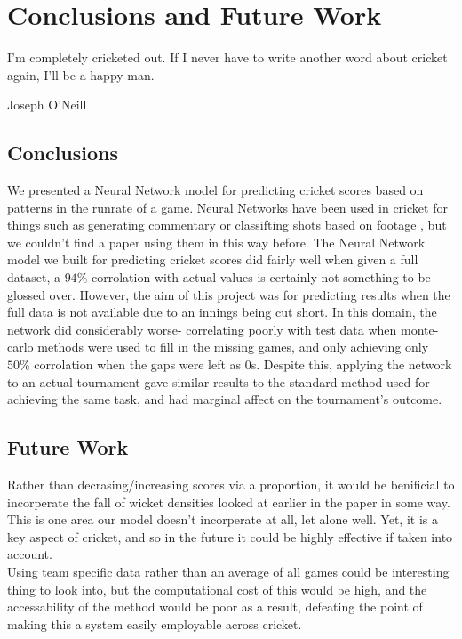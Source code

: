 \chapter{Conclusions and Future Work}

\epigraph{I'm completely cricketed out. If I never have to write another word about cricket again, I'll be a happy man.}{Joseph O'Neill}

\section{Conclusions}
We presented a Neural Network model for predicting cricket scores based on patterns in the runrate of a game. Neural Networks have been used in cricket for things such as 
generating commentary \cite{kumar2} or classifting shots based on footage \cite{foysal}, but we couldn't find a paper using them in this way before. 
The Neural Network model we built for predicting cricket scores did fairly well when given a full dataset, a $94\%$ corrolation with actual values is certainly not 
something to be glossed over. However, the aim of this project was for predicting results when the full data is not available due to an innings being cut short. 
In this domain, the network did considerably worse- correlating poorly with test data when monte-carlo methods were used to fill in the missing games, and only achieving only $50\%$ 
corrolation when the gaps were left as 0s. Despite this, applying the network to an actual tournament gave similar results to the standard method used for achieving the same task, and had 
marginal affect on the tournament's outcome. 


\section{Future Work}
Rather than decrasing/increasing scores via a proportion, it would be benificial to incorperate the fall of wicket densities looked at earlier in the paper in some way. This is one 
area our model doesn't incorperate at all, let alone well. Yet, it is a key aspect of cricket, and so in the future it could be highly effective if taken into account. \\

Using team specific data rather than an average of all games could be interesting thing to look into, but the computational cost of this would be high, and the accessability of the 
method would be poor as a result, defeating the point of making this a system easily employable across cricket. 